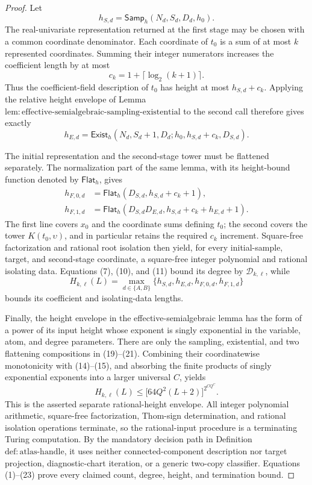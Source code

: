 \documentclass{article}
\begin{document}
\begin{proof}
Let
\[
h_{S,d}=\mathsf{Samp}_h(N_d,S_d,D_d,h_0).                  \tag{19}
\]
The real-univariate representation returned at the first stage may be chosen with a common coordinate denominator.  Each coordinate of \(t_0\) is a sum of at most \(k\) represented coordinates.  Summing their integer numerators increases the coefficient length by at most
\[
c_k=1+\lceil\log_2(k+1)\rceil.
\]
Thus the coefficient-field description of \(t_0\) has height at most \(h_{S,d}+c_k\).  Applying the relative height envelope of Lemma \(\mathrm{lem{:}effective\text{-}semialgebraic\text{-}sampling\text{-}existential}\) to the second call therefore gives exactly
\[
h_{E,d}=\mathsf{Exist}_h
 (N_d,S_d+1,D_d;h_0,h_{S,d}+c_k,D_{S,d}).                 \tag{20}
\]

The initial representation and the second-stage tower must be flattened separately.  The normalization part of the same lemma, with its height-bound function denoted by \(\mathsf{Flat}_h\), gives
\[
\begin{aligned}
h_{F,0,d}
&=\mathsf{Flat}_h(D_{S,d},h_{S,d}+c_k+1),\\
h_{F,1,d}
&=\mathsf{Flat}_h
  (D_{S,d}D_{E,d},h_{S,d}+c_k+h_{E,d}+1).                 \tag{21}
\end{aligned}
\]
The first line covers \(x_0\) and the coordinate sums defining \(t_0\); the second covers the tower \(K(t_0,\upsilon)\), and in particular retains the required \(c_k\) increment.  Square-free factorization and rational root isolation then yield, for every initial-sample, target, and second-stage coordinate, a square-free integer polynomial and rational isolating data.  Equations (7), (10), and (11) bound its degree by \(\mathcal D_{k,\ell}\), while
\[
H_{k,\ell}(L)
=\max_{d\in\{A,B\}}
  \{h_{S,d},h_{E,d},h_{F,0,d},h_{F,1,d}\}                \tag{22}
\]
bounds its coefficient and isolating-data lengths.

Finally, the height envelope in the effective-semialgebraic lemma has the form of a power of its input height whose exponent is singly exponential in the variable, atom, and degree parameters.  There are only the sampling, existential, and two flattening compositions in (19)--(21).  Combining their coordinatewise monotonicity with (14)--(15), and absorbing the finite products of singly exponential exponents into a larger universal \(C\), yields
\[
H_{k,\ell}(L)
\le \bigl[64Q^2(L+2)\bigr]^{2^{CQ^C}}.                   \tag{23}
\]
This is the asserted separate rational-height envelope.  All integer polynomial arithmetic, square-free factorization, Thom-sign determination, and rational isolation operations terminate, so the rational-input procedure is a terminating Turing computation.  By the mandatory decision path in Definition \(\mathrm{def{:}atlas\text{-}handle}\), it uses neither connected-component description nor target projection, diagnostic-chart iteration, or a generic two-copy classifier.  Equations (1)--(23) prove every claimed count, degree, height, and termination bound.
\end{proof}
\end{document}

